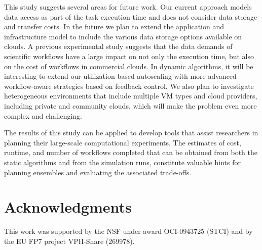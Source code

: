 \documentclass[preprint,5p]{elsarticle}
\begin{document}
This study suggests several areas for future work. Our current approach models
data access as part of the task execution time and does not consider data
storage and transfer costs. In the future we plan to extend the application
and infrastructure model to  include the various data storage options
available on clouds. A previous experimental study \cite{Juve2010} suggests
that the data demands of scientific workflows have a large impact on not only
the execution time, but also on the cost of workflows in commercial clouds. 
In dynamic algorithms, it will be interesting to extend our
utilization-based autoscaling with more advanced workflow-aware strategies
based on feedback control.
We also plan to investigate heterogeneous environments that include multiple VM
types and cloud providers, including private and community clouds, which will
make the problem even more complex and challenging.


The results of this study can be applied to develop tools that assist
researchers in planning their large-scale computational experiments. The
estimates of cost, runtime, and number of workflows completed that can be
obtained from both the static algorithms and from the simulation runs,
constitute valuable hints for planning ensembles and evaluating the
associated trade-offs.


\section*{Acknowledgments}
This work was supported by the NSF under award OCI-0943725 (STCI) and
by the EU FP7 project VPH-Share (269978).

%

%







\end{document}
